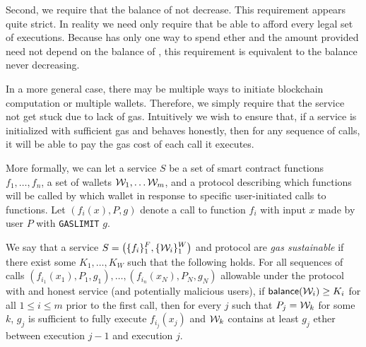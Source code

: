 Second, we require that the balance of \tcadd not decrease.
This requirement appears quite strict.
In reality we need only require that \tc be able to afford every legal set of executions.
Because \tc has only one way to spend ether and the amount provided need not depend on the balance of \tcadd,
this requirement is equivalent to the balance never decreasing.

In a more general case, there may be multiple ways to initiate blockchain computation or multiple wallets.
Therefore, we simply require that the service not get stuck due to lack of gas.
Intuitively we wish to ensure that, if a service is initialized with sufficient gas and behaves honestly,
then for any sequence of calls, it will be able to pay the gas cost of each call it executes.

More formally, we can let a service $S$ be a set of smart contract functions $f_1, \dotsc, f_n$, a set of wallets $\wallet_1, \dotsc \wallet_m$,
and a protocol describing which functions will be called by which wallet in response to specific user-initiated calls to functions.
Let $(f_i(x), P, g)$ denote a call to function $f_i$ with input $x$ made by user $P$ with {\tt GASLIMIT} $g$.

\begin{definition}
  \label{def:gas-sustainability}
  We say that a service $\displaystyle S = \left(\{f_i\}_1^F, \{\wallet_i\}_1^W\right)$ and protocol are \emph{gas sustainable}
  if there exist some $K_1, \dotsc, K_W$ such that the following holds.
  For all sequences of calls $(f_{i_1}(x_1), P_1, g_1), \dotsc, (f_{i_n}(x_N), P_N, g_N)$ allowable under the protocol with and honest service (and potentially malicious users),
  if ${\sf balance}(\wallet_i) \geq K_i$ for all $1 \leq i \leq m$ prior to the first call,
  then for every $j$ such that $P_j = \wallet_k$ for some $k$, $g_j$ is sufficient to fully execute $f_{i_j}(x_j)$ and $\wallet_k$ contains at least $g_j$ ether between execution $j-1$ and execution $j$.
\end{definition}

